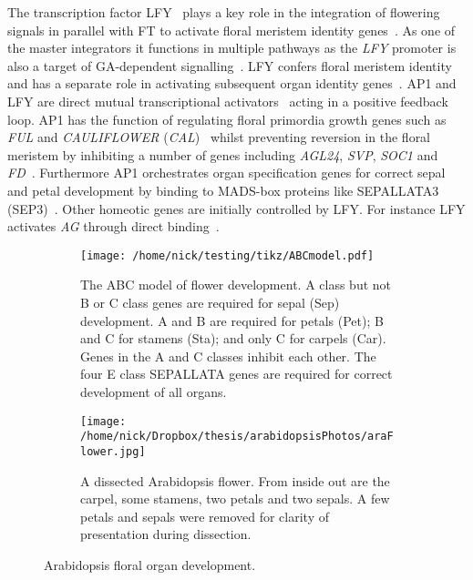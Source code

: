 The transcription factor LFY~\cite{weigel1992,blazquez1997} plays a key role in the integration of flowering signals in parallel with FT to activate floral meristem identity genes~\cite{kardailsky1999}.
As one of the master integrators it functions in multiple pathways as the \emph{LFY} promoter is also a target of GA-dependent signalling~\cite{blazquez1998}.
LFY confers floral meristem identity~\cite{weigel1992} and has a separate role in activating subsequent organ identity genes~\cite{parcy1998}.
AP1 and LFY are direct mutual transcriptional activators~\cite{liljegren1999,wagner1999,kaufmann2010} acting in a positive feedback loop.
AP1 has the function of regulating floral primordia growth genes such as \emph{FUL} and \emph{CAULIFLOWER} (\emph{CAL})~\cite{ferrandiz2000} whilst preventing reversion in the floral meristem by inhibiting a number of genes including \emph{AGL24}, \emph{SVP}, \emph{SOC1} and \emph{FD}~\cite{liu2007,kaufmann2010}.
Furthermore AP1 orchestrates organ specification genes for correct sepal and petal development by binding to MADS-box proteins like SEPALLATA3 (SEP3)~\cite{smaczniak2012,kaufmann2010}.
Other homeotic genes are initially controlled by LFY.
For instance LFY activates \emph{AG} through direct binding~\cite{busch1999}.

\begin{figure*}[!htb]
\begin{subfigure}[b]{0.49\myfullwidth}
   \texttt{[image: /home/nick/testing/tikz/ABCmodel.pdf]}
   \caption{The ABC model of flower development.
     A class but not B or C class genes are required for sepal (Sep) development.
     A and B are required for petals (Pet); B and C for stamens (Sta); and only C for carpels (Car).
     Genes in the A and C classes inhibit each other.
     The four E class SEPALLATA genes are required for correct development of all organs.
   }
  \label{fig:ABC}
\end{subfigure}
\begin{subfigure}[b]{0.49\myfullwidth}
  \texttt{[image: /home/nick/Dropbox/thesis/arabidopsisPhotos/araFlower.jpg]}
\caption{
  A dissected Arabidopsis flower.
  From inside out are the carpel, some stamens, two petals and two sepals.
  A few petals and sepals were removed for clarity of presentation during dissection.
}
\label{fig:araFlower}
\end{subfigure}
\captionsetup{justification=centering}
\caption{Arabidopsis floral organ development.}%
\end{figure*}

